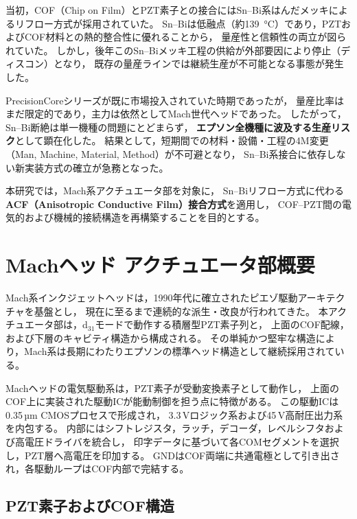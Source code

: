 \documentclass[conference]{IEEEtran}
\begin{document}
当初，COF（Chip on Film）とPZT素子との接合にはSn–Bi系はんだメッキによるリフロー方式が採用されていた。  
Sn–Biは低融点（約\SI{139}{\degreeCelsius}）であり，PZTおよびCOF材料との熱的整合性に優れることから，
量産性と信頼性の両立が図られていた。  
しかし，後年このSn–Biメッキ工程の供給が外部要因により停止（ディスコン）となり，
既存の量産ラインでは継続生産が不可能となる事態が発生した。  

PrecisionCoreシリーズが既に市場投入されていた時期であったが，
量産比率はまだ限定的であり，主力は依然としてMach世代ヘッドであった。  
したがって，Sn–Bi断絶は単一機種の問題にとどまらず，
\textbf{エプソン全機種に波及する生産リスク}として顕在化した。  
結果として，短期間での材料・設備・工程の4M変更（Man, Machine, Material, Method）が不可避となり，
Sn–Bi系接合に依存しない新実装方式の確立が急務となった。  

本研究では，Mach系アクチュエータ部を対象に，
Sn–Biリフロー方式に代わる\textbf{ACF（Anisotropic Conductive Film）接合方式}を適用し，
COF–PZT間の電気的および機械的接続構造を再構築することを目的とする。

\section{Machヘッド アクチュエータ部概要}

Mach系インクジェットヘッドは，1990年代に確立されたピエゾ駆動アーキテクチャを基盤とし，
現在に至るまで連続的な派生・改良が行われてきた。  
本アクチュエータ部は，d$_{31}$モードで動作する積層型PZT素子列と，
上面のCOF配線，および下層のキャビティ構造から構成される。  
その単純かつ堅牢な構造により，Mach系は長期にわたりエプソンの標準ヘッド構造として継続採用されている。

Machヘッドの電気駆動系は，PZT素子が受動変換素子として動作し，
上面のCOF上に実装された駆動ICが能動制御を担う点に特徴がある。  
この駆動ICは0.35\,µm CMOSプロセスで形成され，
3.3\,Vロジック系および45\,V高耐圧出力系を内包する。  
内部にはシフトレジスタ，ラッチ，デコーダ，レベルシフタおよび高電圧ドライバを統合し，
印字データに基づいて各COMセグメントを選択し，PZT層へ高電圧を印加する。  
GNDはCOF両端に共通電極として引き出され，各駆動ループはCOF内部で完結する。  

\subsection{PZT素子およびCOF構造}
\end{document}
